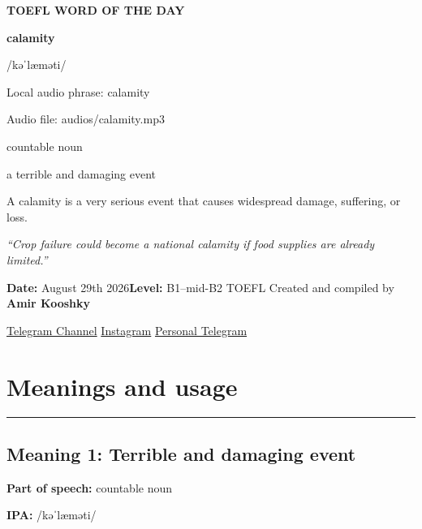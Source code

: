 \documentclass[11pt]{article}
\newcommand{\sectionrule}{\par\vspace{-0.5em}\noindent\textcolor{Accent}{\rule{\linewidth}{0.6pt}}\par}
\begin{document}
\begin{center}
{\sffamily\bfseries\color{Accent} TOEFL WORD OF THE DAY\par}
\vspace{8mm}
{\fontsize{42}{48}\selectfont\bfseries calamity\par}
\vspace{2mm}
{\Large\sffamily\color{Accent} /kəˈlæməti/\par}
\vspace{2mm}
{\small\sffamily Local audio phrase: calamity\par}
{\small\sffamily Audio file: audios/calamity.mp3\par}
\vspace{2mm}
{\large\sffamily\color{Muted} countable noun\par}
\vspace{5mm}
{\sffamily a terrible and damaging event\par}
\vspace{6mm}
{\large A calamity is a very serious event that causes widespread damage, suffering, or loss.\par}
\vspace{6mm}
\begin{minipage}{0.84\textwidth}
\itshape “Crop failure could become a national calamity if food supplies are already limited.”
\end{minipage}\par
\vspace{10mm}
\textbf{Date:} August 29th 2026\quad\textbullet\quad \textbf{Level:} B1--mid-B2 TOEFL
\vfill
Created and compiled by \textbf{Amir Kooshky}\par
\vspace{2mm}
\href{https://t.me/KooshkyTOEFL}{Telegram Channel}\quad\textbullet\quad
\href{https://www.instagram.com/kooshkytoefl}{Instagram}\quad\textbullet\quad
\href{https://t.me/KooshkyTOEFL\_pv}{Personal Telegram}
\end{center}
\newpage
\tableofcontents
\newpage

\section{Meanings and usage}
\sectionrule
\subsection{Meaning 1: Terrible and damaging event}
\textbf{Part of speech:} countable noun

\textbf{IPA:} /kəˈlæməti/
\end{document}
